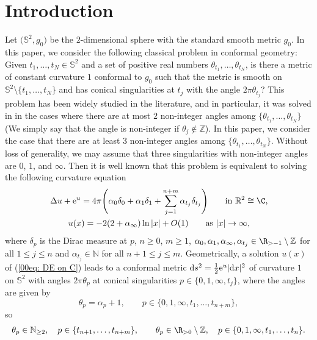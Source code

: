\section{Introduction}

Let $\bigl(\mathbb{S}^2,g_0\bigr)$ be the $2$-dimensional
sphere with the standard smooth metric $g_0$.
In this paper, we consider the following classical problem in conformal geometry:
Given $t_1,\dots,t_N\in \mathbb{S}^2$ and a set
of positive real numbers $\theta_{t_1},\dots,\theta_{t_N}$, is there
 a metric of constant curvature $1$ conformal to $g_0$
such that the
metric is smooth on $\mathbb{S}^2\setminus\{t_1,\dots,t_N\}$ and has conical
singularities at $t_j$ with the angle $2\pi\theta_{t_j}$? This problem has been widely studied in the literature, and in particular, it
was solved in \cite{Eremenko,Coaxial,EGT} in the cases where there are at
most $2$ non-integer angles among
$\{\theta_{t_1},\dots,\theta_{t_N}\}$ \big(We simply say that the angle
is non-integer if $\theta_j\notin\mathbb{Z}$\big). In this paper, we
consider the case that there are at least $3$ non-integer angles among
$\{\theta_{t_1},\dots,\theta_{t_N}\}$. Without loss of generality, we
may assume that three singularities with non-integer angles are $0$,
$1$, and $\infty$.
Then it is well known that this problem is equivalent to solving
 the following curvature
equation
\begin{gather}
 \Delta u+{\rm e}^u=4\pi\Biggl(\alpha_0\delta_{0}+\alpha_1\delta_{1}
 +\sum_{j=1}^{n+m}\alpha_{t_j}\delta_{t_j}\Biggr)
 \qquad \text{in }\mathbb R^2\cong\C,\nonumber \\
 u(x)=-2(2+\alpha_\infty)\ln|x|+O(1) \qquad \text{as }|x|\to\infty, \label{00eq: DE on C}
 \end{gather}
where $\delta_p$ is the Dirac measure at $p$, $n\geq 0$, $m\geq 1$, $\alpha_0, \alpha_1, \alpha_\infty,
\alpha_{t_j}\in\R_{>-1}\setminus\mathbb{Z}$ for all $1\leq j\leq n$
and $\alpha_{t_j}\in\mathbb{N}$ for all $n+1\leq j\leq
m$. Geometrically, a solution $u(x)$ of (\ref{00eq: DE on C}) leads to
a conformal metric ${\rm d}s^2=\frac12{\rm e}^u|{\rm d}x|^2$ of
curvature $1$ on $\mathbb{S}^2$ with angles $2\pi\theta_{p}$ at conical
singularities $p\in\{0,1,\infty, t_j\}$, where the angles are given by
\begin{equation*} %
 \theta_{p}=\alpha_p+1, \qquad
 p\in \{0,1,\infty, t_1,\dots,t_{n+m}\},
\end{equation*}
so
\begin{gather*} %
 \theta_{p}\in \mathbb{N}_{\geq 2}, \quad
 p\in \{t_{n+1},\dots,t_{n+m}\},\qquad
 \theta_p\in \R_{>0}\setminus\mathbb{Z},\quad p\in\{0,1,\infty,t_1,\dots,t_n\}.
\end{gather*}
